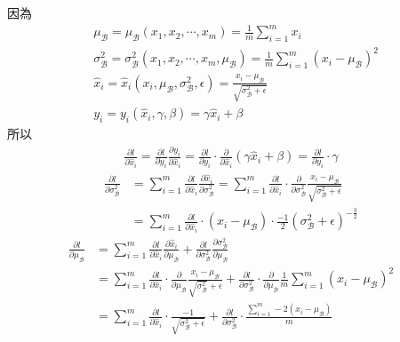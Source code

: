 \documentclass{article}
\begin{document}
\noindent
因為
\begin{align*}
    &\mu_{\mathcal B} = \mu_{\mathcal B} (x_1, x_2, \cdots, x_m) = \frac{1}{m} \sum_{i = 1}^m x_i\\
    &\sigma^2_{\mathcal B} = \sigma^2_{\mathcal B} (x_1, x_2, \cdots, x_m, \mu_{\mathcal B}) = \frac{1}{m} \sum_{i = 1}^m (x_i - \mu_{\mathcal B})^2\\
    &{\hat x}_i = {\hat x}_i (x_i, \mu_{\mathcal B}, \sigma^2_{\mathcal B}, \epsilon) = \frac{x_i - \mu_{\mathcal B}}{\sqrt{\sigma^2_{\mathcal B} + \epsilon}}\\
    &y_i = y_i ({\hat x}_i, \gamma, \beta) = \gamma {\hat x}_i + \beta
\end{align*}
所以
\begin{align*}
    \frac{\partial l}{\partial {\hat x}_i} = \frac{\partial l}{\partial y_i} \frac{\partial y_i}{\partial {\hat x}_i} = \frac{\partial l}{\partial y_i} \cdot \frac{\partial}{\partial {\hat x}_i} (\gamma {\hat x}_i + \beta) = \frac{\partial l}{\partial y_i} \cdot \gamma
\end{align*}
\begin{align*}
    \frac{\partial l}{\partial \sigma^2_{\mathcal B}} &= \sum_{i = 1}^m \frac{\partial l}{\partial {\hat x}_i} \frac{\partial {\hat x}_i}{\partial \sigma^2_{\mathcal B}} = \sum_{i = 1}^m \frac{\partial l}{\partial {\hat x}_i} \cdot \frac{\partial}{\partial \sigma^2_{\mathcal B}} \frac{x_i - \mu_{\mathcal B}}{\sqrt{\sigma^2_{\mathcal B} + \epsilon}}\\
    &= \sum_{i = 1}^m \frac{\partial l}{\partial {\hat x}_i} \cdot (x_i - \mu_{\mathcal B}) \cdot \frac{-1}{2} (\sigma^2_{\mathcal B} + \epsilon)^{-\frac{3}{2}}
\end{align*}
\begin{align*}
    \frac{\partial l}{\partial \mu_{\mathcal B}} &= \sum_{i = 1}^m \frac{\partial l}{\partial {\hat x}_i} \frac{\partial {\hat x}_i}{\partial \mu_{\mathcal B}} + \frac{\partial l}{\partial \sigma^2_{\mathcal B}} \frac{\partial \sigma^2_{\mathcal B}}{\partial \mu_{\mathcal B}}\\
    &= \sum_{i = 1}^m \frac{\partial l}{\partial {\hat x}_i} \cdot \frac{\partial}{\partial \mu_{\mathcal B}} \frac{x_i - \mu_{\mathcal B}}{\sqrt{\sigma^2_{\mathcal B}} + \epsilon} + \frac{\partial l}{\partial \sigma^2_{\mathcal B}} \cdot \frac{\partial}{\partial \mu_{\mathcal B}} \frac{1}{m} \sum_{i = 1}^m (x_i - \mu_{\mathcal B})^2\\
    &= \sum_{i = 1}^m \frac{\partial l}{\partial {\hat x}_i} \cdot \frac{-1}{\sqrt{\sigma^2_{\mathcal B} + \epsilon}} + \frac{\partial l}{\partial \sigma^2_{\mathcal B}} \cdot \frac{\sum_{i = 1}^m -2(x_i - \mu_{\mathcal B})}{m}
\end{align*}
\end{document}
